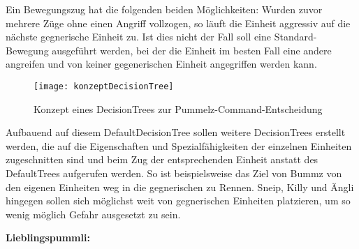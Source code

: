 Ein Bewegungszug hat die folgenden beiden Möglichkeiten: Wurden zuvor mehrere Züge ohne einen Angriff vollzogen, so läuft die Einheit aggressiv auf die nächste gegnerische Einheit zu. Ist dies nicht der Fall soll eine Standard-Bewegung ausgeführt werden, bei der die Einheit im besten Fall eine andere angreifen und von keiner gegenerischen Einheit angegriffen werden kann.

\begin{figure}[H]
	\centering
	\texttt{[image: konzeptDecisionTree]}
	\caption{Konzept eines DecisionTrees zur Pummelz-Command-Entscheidung}
	\label{fig:konzeptDecisionTree}
\end{figure}

Aufbauend auf diesem DefaultDecisionTree sollen weitere DecisionTrees erstellt werden, die auf die Eigenschaften und Spezialfähigkeiten der einzelnen Einheiten zugeschnitten sind und beim Zug der entsprechenden Einheit anstatt des DefaultTrees aufgerufen werden. So ist beispielsweise das Ziel von Bummz von den eigenen Einheiten weg in die gegnerischen zu Rennen. Sneip, Killy und Ängli hingegen sollen sich möglichst weit von gegnerischen Einheiten platzieren, um so wenig möglich Gefahr ausgesetzt zu sein.

\textbf{Lieblingspummli:} 